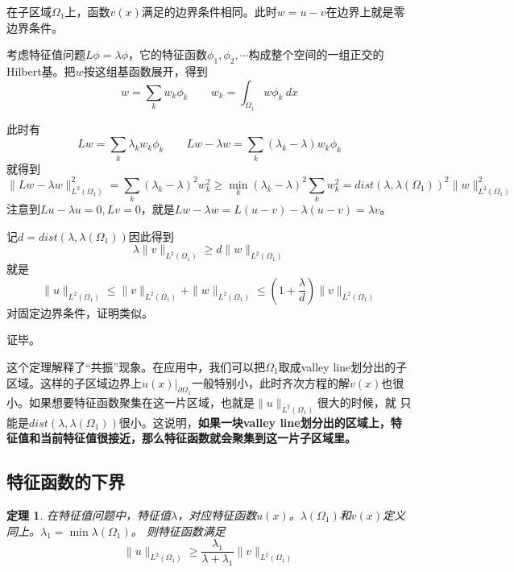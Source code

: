 \documentclass[12pt,a4paper]{article}
\newtheorem{theorem}{定理}
\begin{document}
在子区域$\Omega_1$上，函数$v(x)$满足的边界条件相同。此时$w = u - v$在边界上就是零边界条件。

考虑特征值问题$L \phi = \lambda \phi$，它的特征函数$\phi_1, \phi_2, \cdots$构成整个空间的一组正交的Hilbert基。把$w$按这组基函数展开，得到
\begin{equation}
w = \sum_k w_k \phi_k \qquad w_k = \int_{\Omega_1} w \phi_k \ dx
\end{equation}

此时有
\begin{equation}
L w = \sum_k \lambda_k w_k \phi_k \qquad L w - \lambda w = \sum_k (\lambda_k - \lambda) w_k \phi_k
\end{equation}
就得到
\begin{equation}\label{eq0}
\| L w - \lambda w \|_{L^2(\Omega_1)}^2 = \sum_k (\lambda_k - \lambda)^2 w_k^2 \geq \min_k (\lambda_k - \lambda)^2\sum_k w_k^2 = dist(\lambda, \lambda(\Omega_1))^2 \|w\|_{L^2(\Omega_1)}^2
\end{equation}
注意到$L u - \lambda u = 0, L v = 0$，就是$L w - \lambda w = L(u - v) - \lambda(u - v) = \lambda v$。

记$d = dist(\lambda, \lambda(\Omega_1))$因此得到
\begin{equation}
\lambda \| v \|_{L^2(\Omega_1)} \geq d \|w\|_{L^2(\Omega_1)}
\end{equation}
就是
\begin{equation}
\|u\|_{L^2(\Omega_1)} \leq \|v\|_{L^2(\Omega_1)} + \|w\|_{L^2(\Omega_1)} \leq (1 + \frac{\lambda}{d}) \|v\|_{L^2(\Omega_1)}
\end{equation}
对固定边界条件，证明类似。

证毕。

这个定理解释了“共振”现象。在应用中，我们可以把$\Omega_1$取成valley line划分出的子区域。这样的子区域边界上$u(x)|_{\partial \Omega_1}$一般特别小，此时齐次方程的解$v(x)$也很小。如果想要特征函数聚集在这一片区域，也就是$\|u\|_{L^2(\Omega_1)}$很大的时候，就 只能是$dist(\lambda, \lambda(\Omega_1))$很小。这说明，\textbf{如果一块valley line划分出的区域上，特征值和当前特征值很接近，那么特征函数就会聚集到这一片子区域里。}

\subsection{特征函数的下界}

\begin{theorem}

在特征值问题中，特征值$\lambda$，对应特征函数$u(x)$。$\lambda(\Omega_1)$和$v(x)$定义同上。$\lambda_1 = \min \lambda(\Omega_1)$。
则特征函数满足
\begin{equation}
\|u\|_{L^2(\Omega_1)} \geq \frac{\lambda_1}{\lambda + \lambda_1} \|v\|_{L^2(\Omega_1)}
\end{equation}

\end{theorem}
\end{document}
